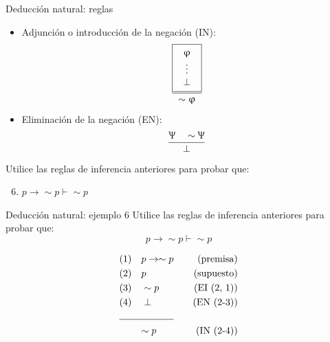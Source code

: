 \documentclass{beamer}
\begin{document}
\begin{frame}{Deducción natural: reglas}
  \begin{itemize}
    \item Adjunción o introducción de la negación (IN):
          \begin{equation*}
            \frac{
              \fbox{
                $\begin{array}{c}
                  \upvarphi \\
                  \vdots \\
                  \perp
                \end{array}$
              }
            }{\sim \upvarphi}
          \end{equation*}

    \item Eliminación de la negación (EN):
    $$\dfrac{\Uppsi \quad \sim \Uppsi}{\perp}$$

  \end{itemize}

  Utilice las reglas de inferencia anteriores para probar que:
  \begin{enumerate}
    \setcounter{enumi}{5}
    \item $p \rightarrow \sim p \vdash \sim p$
  \end{enumerate}
\end{frame}


\begin{frame}{Deducción natural: ejemplo 6}
  Utilice las reglas de inferencia anteriores para probar que:
  $$p \rightarrow \sim p \vdash \sim p$$

  \begin{align*}
    &(1) \quad p \rightarrow \sim p  & \quad (\text{premisa}) \\
    &(2) \quad p  & \quad (\text{supuesto}) \\
    &(3) \quad \sim p  & \quad (\text{EI (2, 1)}) \\
    &(4) \quad \perp  & \quad (\text{EN (2-3)}) \\
    \cline{1-2}
    & \qquad \sim p & \quad (\text{IN (2-4)})
  \end{align*}

\end{frame}
\end{document}
